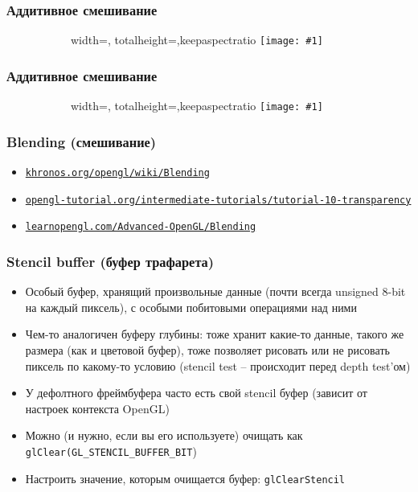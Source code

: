 \documentclass{beamer}
\newcommand{\slideimage}[1]{
  \begin{figure}
    \begin{adjustbox}{width=\textwidth, totalheight=\textheight-2\baselineskip-2\baselineskip,keepaspectratio}
      \texttt{[image: \#1]}
    \end{adjustbox}
  \end{figure}
}
\begin{document}
\begin{frame}
\frametitle{Аддитивное смешивание}
\begin{figure}
\slideimage{heatmap.jpg}
\end{figure}
\end{frame}

\begin{frame}
\frametitle{Аддитивное смешивание}
\begin{figure}
\slideimage{galaxy.jpg}
\end{figure}
\end{frame}

\begin{frame}[fragile]
\frametitle{Blending (смешивание)}
\begin{itemize}
\item \href{https://www.khronos.org/opengl/wiki/Blending}{\nolinkurl{khronos.org/opengl/wiki/Blending}}
\item \href{http://www.opengl-tutorial.org/intermediate-tutorials/tutorial-10-transparency/}{\nolinkurl{opengl-tutorial.org/intermediate-tutorials/tutorial-10-transparency}}
\item \href{https://learnopengl.com/Advanced-OpenGL/Blending}{\nolinkurl{learnopengl.com/Advanced-OpenGL/Blending}}
\end{itemize}
\end{frame}

\begin{frame}[fragile]
\frametitle{Stencil buffer (буфер трафарета)}
\begin{itemize}
\item Особый буфер, хранящий произвольные данные (почти всегда unsigned 8-bit на каждый пиксель), с особыми побитовыми операциями над ними
\pause
\item Чем-то аналогичен буферу глубины: тоже хранит какие-то данные, такого же размера (как и цветовой буфер), тоже позволяет рисовать или не рисовать пиксель по какому-то условию (stencil test -- происходит перед depth test'ом)
\pause
\item У дефолтного фреймбуфера часто есть свой stencil буфер (зависит от настроек контекста OpenGL)
\pause
\item Можно (и нужно, если вы его используете) очищать как \verb|glClear(GL_STENCIL_BUFFER_BIT|)
\pause
\item Настроить значение, которым очищается буфер: \verb|glClearStencil|
\end{itemize}
\end{frame}
\end{document}
